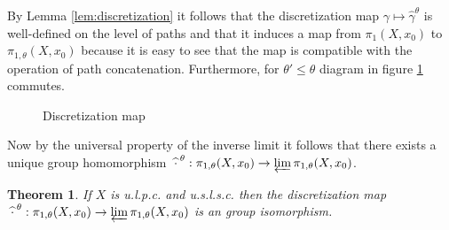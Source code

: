 \documentclass[a4paper, 11pt, twoside]{article}
\theoremstyle{break}
\newtheorem{thm}{Theorem}[section]
\theoremstyle{break}
\begin{document}
By Lemma \ref{lem:discretization} it follows that the discretization map $\gamma \mapsto \widehat{\gamma}^{\theta}$ is well-defined on the level of paths
and that it induces a map from $\pi_1(X, x_0)$ to $\pi_{1,\theta}(X, x_0)$ because it is easy to see that the map is compatible with the operation of path concatenation.
Furthermore, for $\theta' \leq \theta$ diagram in figure \ref{fig:discretization} commutes.

\begin{figure}[ht!]
  \centering
  \caption{Discretization map}\label{fig:discretization}
\end{figure}

Now by the universal property of the inverse limit it follows that there exists a unique group homomorphism $\: \widehat{\cdot}^{\hspace*{2px}\theta}: \pi_{1,\theta}(X, x_0) \to \varprojlim \pi_{1,\theta}(X, x_0)$.

\begin{thm}
  If $X$ is u.l.p.c. and u.s.l.s.c. then the discretization map $\: \widehat{\cdot}^{\hspace*{2px}\theta}: \pi_{1,\theta}(X, x_0) \to \varprojlim \pi_{1,\theta}(X, x_0)$ is an group isomorphism.
\end{thm}
\end{document}
